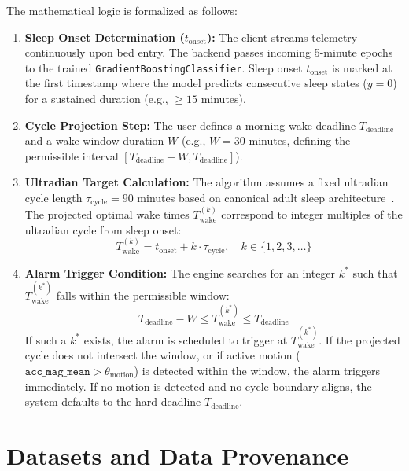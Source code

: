 \documentclass[journal,11pt,onecolumn]{IEEEtran}
\begin{document}
The mathematical logic is formalized as follows:
\begin{enumerate}[leftmargin=*]
    \item \textbf{Sleep Onset Determination ($t_{\text{onset}}$):} The client streams telemetry continuously upon bed entry. The backend passes incoming 5-minute epochs to the trained \texttt{GradientBoostingClassifier}. Sleep onset $t_{\text{onset}}$ is marked at the first timestamp where the model predicts consecutive sleep states ($y=0$) for a sustained duration (e.g., $\ge 15$ minutes).
    \item \textbf{Cycle Projection Step:} The user defines a morning wake deadline $T_{\text{deadline}}$ and a wake window duration $W$ (e.g., $W = 30$ minutes, defining the permissible interval $[T_{\text{deadline}} - W, T_{\text{deadline}}]$).
    \item \textbf{Ultradian Target Calculation:} The algorithm assumes a fixed ultradian cycle length $\tau_{\text{cycle}} = 90$ minutes based on canonical adult sleep architecture~\cite{carskadon2011normal}. The projected optimal wake times $T_{\text{wake}}^{(k)}$ correspond to integer multiples of the ultradian cycle from sleep onset:
    \begin{equation}
    \label{eq:cycle_projection}
    T_{\text{wake}}^{(k)} = t_{\text{onset}} + k \cdot \tau_{\text{cycle}}, \quad k \in \{1, 2, 3, \dots\}
    \end{equation}
    \item \textbf{Alarm Trigger Condition:} The engine searches for an integer $k^*$ such that $T_{\text{wake}}^{(k^*)}$ falls within the permissible window:
    \begin{equation}
    \label{eq:alarm_trigger}
    T_{\text{deadline}} - W \le T_{\text{wake}}^{(k^*)} \le T_{\text{deadline}}
    \end{equation}
    If such a $k^*$ exists, the alarm is scheduled to trigger at $T_{\text{wake}}^{(k^*)}$. If the projected cycle does not intersect the window, or if active motion ($\texttt{acc\_mag\_mean} > \theta_{\text{motion}}$) is detected within the window, the alarm triggers immediately. If no motion is detected and no cycle boundary aligns, the system defaults to the hard deadline $T_{\text{deadline}}$.
\end{enumerate}

\section{Datasets and Data Provenance}
\label{sec:datasets}
\end{document}
